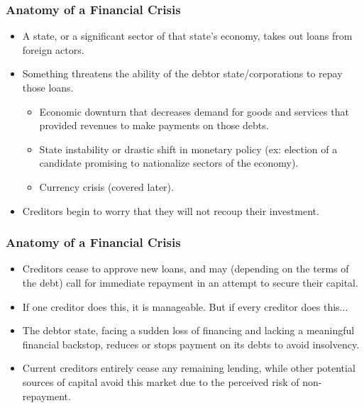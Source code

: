 \documentclass[handout]{beamer}
\begin{document}
\begin{frame} 
	\frametitle{\LARGE{Anatomy of a Financial Crisis}}
	\begin{itemize}
		\item A state, or a significant sector of that state's economy, takes out loans from foreign actors. \pause
		\item Something threatens the ability of the debtor state/corporations to repay those loans. \pause
		\begin{itemize}
			\item Economic downturn that decreases demand for goods and services that provided revenues to make payments on those debts. \pause
			\item State instability or drastic shift in monetary policy (ex: election of a candidate promising to nationalize sectors of the economy). \pause
			\item Currency crisis (covered later).
		\end{itemize}
	\item Creditors begin to worry that they will not recoup their investment.
	\end{itemize}
\end{frame}

\begin{frame} 
	\frametitle{\LARGE{Anatomy of a Financial Crisis}}
	\begin{itemize}
		\item Creditors cease to approve new loans, and may (depending on the terms of the debt) call for immediate repayment in an attempt to secure their capital. \pause
		\item If one creditor does this, it is manageable. But if every creditor does this... \pause
		\item The debtor state, facing a sudden loss of financing and lacking a meaningful financial backstop, reduces or stops payment on its debts to avoid insolvency. \pause
		\item Current creditors entirely cease any remaining lending, while other potential sources of capital avoid this market due to the perceived risk of non-repayment. 	
	\end{itemize}
\end{frame}
\end{document}
